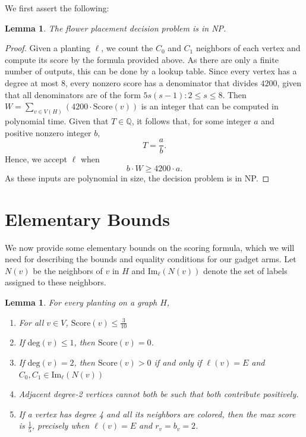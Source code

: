 \documentclass[11pt]{article}
\theoremstyle{plain}
\newtheorem{lemma}[theorem]{Lemma}
\begin{document}
We first assert the following:

\begin{lemma} \label{lem:NPmembership}
    The flower placement decision problem is in NP.
\end{lemma}
\begin{proof}

Given a planting $\ell$, we count the $C_0$ and $C_1$ neighbors of each vertex and compute its score by the formula provided above. As there are only a finite number of outputs, this can be done by a lookup table. Since every vertex has a degree at most $8$, every nonzero score has a denominator that divides $4200$, given that all denominators are of the form $5s(s-1): 2 \leq s \leq 8$. Then
$W = \sum_{v \in V(H)}(4200 \cdot \mathrm{Score}(v))$
is an integer that can be computed in polynomial time. Given that $T \in \mathbb{Q}$, it follows that, for some integer $a$ and positive nonzero integer $b$,
\[T = \frac{a}{b}.\]
Hence, we accept $\ell$ when
\[b\cdot W \geq 4200\cdot a.\]
As these inputs are polynomial in size, the decision problem is in NP. 
    
\end{proof}

\section{Elementary Bounds} \label{sec:elembound}

We now provide some elementary bounds on the scoring formula, which we will need for describing the bounds and equality conditions for our gadget arms. Let $N(v)$ be the neighbors of $v$ in $H$ and $\mathrm{Im}_{\ell}(N(v))$ denote the set of labels assigned to these neighbors. 

\begin{lemma} \label{lem:elementarybounds}
For every planting on a graph $H$,
    \begin{enumerate}
        \item For all $v \in V$, $\mathrm{Score}(v) \leq \frac{3}{10}$
        \item If $\mathrm{deg}(v) \leq 1$, then $\mathrm{Score}(v) = 0$.
        \item If $\mathrm{deg}(v) = 2$, then $\mathrm{Score}(v) > 0$ if and only if $\ell(v) = E$ and $C_0, C_1 \in \mathrm{Im}_\ell (N(v))$
        \item Adjacent degree-2 vertices cannot both be such that both contribute positively.
        \item If a vertex has degree 4 and all its neighbors are colored, then the max score is $\frac{1}{5}$, precisely when $\ell(v)=E$ and $r_v=b_v=2$.
    \end{enumerate}
\end{lemma}
\end{document}
